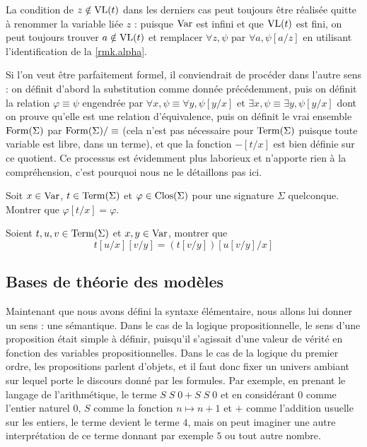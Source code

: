 \begin{remark}
  La condition de $z\notin\operatorname{VL}(t)$ dans les derniers cas peut toujours être
  réalisée quitte à renommer la variable liée $z$ : puisque $\operatorname{Var}$ est infini
  et que $\operatorname{VL}(t)$ est fini, on peut toujours trouver $a\notin\operatorname{VL}(t)$ et remplacer
  $\forall z, \psi$ par $\forall a, \psi[a/z]$ en utilisant l'identification de
  la \cref{rmk.alpha}.

  Si l'on veut être parfaitement formel, il conviendrait de procéder dans l'autre
  sens : on définit d'abord la substitution comme donnée précédemment, puis on
  définit la relation $\varphi \equiv \psi$ engendrée par
  $\forall x, \psi \equiv \forall y, \psi[y/x]$ et
  $\exists x,\psi \equiv\exists y, \psi[y/x]$ dont on prouve qu'elle est une
  relation d'équivalence, puis on définit le \og vrai\fg{} ensemble
  $\operatorname{Form}(\Sigma)$ par $\operatorname{Form}(\Sigma)/ \equiv$ (cela n'est pas nécessaire
  pour $\operatorname{Term}(\Sigma)$ puisque toute variable est libre, dans un terme), et que
  la fonction $-[t/x]$ est bien définie sur ce quotient. Ce processus est
  évidemment plus laborieux et n'apporte rien à la compréhension, c'est pourquoi
  nous ne le détaillons pas ici.
\end{remark}

\begin{exercise}
  Soit $x\in \operatorname{Var}$, $t\in\operatorname{Term}(\Sigma)$ et $\varphi\in\operatorname{Clos}(\Sigma)$ pour une
  signature $\Sigma$ quelconque. Montrer que $\varphi[t/x] = \varphi$.
\end{exercise}

\begin{exercise}
  Soient $t,u,v\in\operatorname{Term}(\Sigma)$ et $x,y\in\operatorname{Var}$, montrer que
  \[t[u/x][v/y] = (t[v/y])[u[v/y]/x]\]
\end{exercise}

\subsection{Bases de théorie des modèles}

Maintenant que nous avons défini la syntaxe élémentaire, nous allons lui donner
un sens : une sémantique. Dans le cas de la logique propositionnelle, le sens
d'une proposition était simple à définir, puisqu'il s'agissait d'une valeur de
vérité en fonction des variables propositionnelles. Dans le cas de la logique du
premier ordre, les propositions parlent d'objets, et il faut donc fixer un
univers ambiant sur lequel porte le discours donné par les formules. Par exemple,
en prenant le langage de l'arithmétique, le terme $S\;S\;0 + S\;S\;0$ et en
considérant $0$ comme l'entier naturel $0$, $S$ comme la fonction
$n \mapsto n + 1$ et $+$ comme l'addition usuelle sur les entiers, le terme
devient le terme $4$, mais on peut imaginer une autre interprétation de ce terme
donnant par exemple $5$ ou tout autre nombre.

